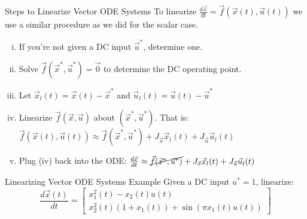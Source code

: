 \documentclass{beamer}
\begin{document}
	\begin{frame}{Steps to Linearize Vector ODE Systems}
	To linearize $\frac{d\vec{x}}{dt} = \vec{f}(\vec{x}(t), \vec{u}(t))$ we use a similar procedure as we did for the scalar case. \pause 
	\begin{enumerate}[(i)]
	    \item If you're not given a DC input $\vec{u}^*$, determine one. \pause \\
	    \item Solve $\vec{f}(\vec{x}^*, \vec{u}^*) = \vec{0}$ to determine the DC operating point. \pause \\
	    \item Let $\vec{x}_l(t) = \vec{x}(t) - \vec{x}^*$ and $\vec{u}_l(t) = \vec{u}(t) - \vec{u}^*$ \pause \\
	    \item Linearize $\vec{f}(\vec{x}, \vec{u})$ about $(\vec{x}^*, \vec{u}^*)$. That is: $\vec{f}(\vec{x}(t), \vec{u}(t)) \approx \vec{f}(\vec{x}^*, \vec{u}^*) + J_{\vec{x}}\vec{x}_l(t) + J_{\vec{u}}\vec{u}_l(t)$ \pause \\
	    \item Plug (iv) back into the ODE: $\frac{d\vec{x}}{dt} \approx \cancel{\vec{f}(\vec{x}^*, \vec{u}^*)} + J_{\vec{x}}\vec{x}_l(t) + J_{\vec{u}}\vec{u}_l(t)$
	\end{enumerate}

	\end{frame}

	\begin{frame}{Linearizing Vector ODE Systems Example}
	    Given a DC input $u^* = 1$, linearize: 
	    \[
	    \frac{d\vec{x}(t)}{dt} = \begin{bmatrix}
	    x_1^2(t) - x_2(t)u(t)\\
	    x_2^2(t)(1 + x_1(t)) + \sin(\pi x_1(t)u(t))
	    \end{bmatrix}
	    \]
	    
	\end{frame}
\end{document}
